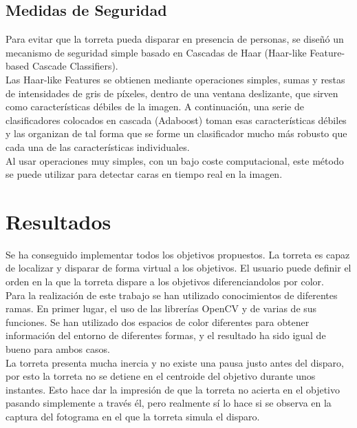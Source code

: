 \subsection{Medidas de Seguridad}
Para evitar que la torreta pueda disparar en presencia de personas, se diseñó un mecanismo de seguridad simple basado en Cascadas de Haar (Haar-like Feature-based Cascade Classifiers).\\

Las Haar-like Features se obtienen mediante operaciones simples, sumas y restas de intensidades de gris de píxeles, dentro de una ventana deslizante, que sirven como características débiles de la imagen. 
A continuación, una serie de clasificadores colocados en cascada (Adaboost) toman esas características débiles y las organizan de tal forma que se forme un clasificador mucho más robusto que cada una de las características individuales.\\

Al usar operaciones muy simples, con un bajo coste computacional, este método se puede utilizar para detectar caras en tiempo real en la imagen.\\

\newpage


\section{Resultados}
Se ha conseguido implementar todos los objetivos propuestos. La torreta es capaz de localizar y disparar de forma virtual a los objetivos. El usuario puede definir el orden en la que la torreta dispare a los objetivos diferenciandolos por color.\\

Para la realización de este trabajo se han utilizado conocimientos de diferentes ramas. En primer lugar, el uso de las librerías OpenCV y de varias de sus funciones. Se han utilizado dos espacios de color diferentes para obtener información del entorno de diferentes formas, y el resultado ha sido igual de bueno para ambos casos.\\

La torreta presenta mucha inercia y no existe una pausa justo antes del disparo, por esto la torreta no se detiene en el centroide del objetivo durante unos instantes. Esto hace dar la impresión de que la torreta no acierta en el objetivo pasando simplemente a través él, pero realmente sí lo hace si se observa en la captura del fotograma en el que la torreta simula el disparo.\\

